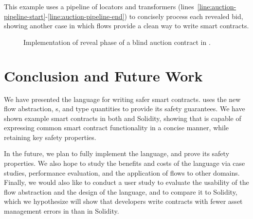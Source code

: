 \documentclass[nonacm, dvipsnames, sigconf]{acmart}
\begin{document}
This example uses a pipeline of locators and transformers (lines~\ref{line:auction-pipeline-start}-\ref{line:auction-pipeline-end}) to concisely process each revealed bid, showing another case in which flows provide a clean way to write smart contracts.

\begin{figure}
    \centering
    
    \caption{Implementation of reveal phase of a blind auction contract in \langName.}
    \label{fig:blind-auction-impl-flow}
\end{figure}

\section{Conclusion and Future Work}

We have presented the \langName language for writing safer smart contracts.
\langName uses the new flow abstraction, \assetTxt{}s, and type quantities to provide its safety guarantees.
We have shown example smart contracts in both \langName and Solidity, showing that \langName is capable of expressing common smart contract functionality in a concise manner, while retaining key safety properties.

In the future, we plan to fully implement the \langName language, and prove its safety properties.
We also hope to study the benefits and costs of the language via case studies, performance evaluation, and the application of flows to other domains.
Finally, we would also like to conduct a user study to evaluate the usability of the flow abstraction and the design of the language, and to compare it to Solidity, which we hypothesize will show that developers write contracts with fewer asset management errors in \langName than in Solidity.



\end{document}
